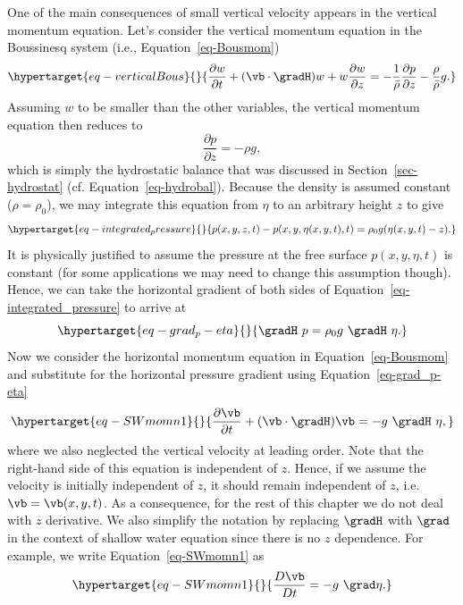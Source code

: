 \documentclass[
  letterpaper,
  twocolumn,
  landscape]{report}
\begin{document}
One of the main consequences of small vertical velocity appears in the
vertical momentum equation. Let's consider the vertical momentum
equation in the Boussinesq system (i.e., Equation~\ref{eq-Bousmom})
\begin{equation}\protect\hypertarget{eq-verticalBous}{}{ \frac{\partial w}{\partial t} + (\vb \cdot\gradH)w + w \frac{\partial w}{\partial z} = -\frac{1}{\bar\rho} \frac{\partial p}{\partial z} -\frac{\rho}{\bar\rho}g. 
}\label{eq-verticalBous}\end{equation} Assuming \(w\) to be smaller than
the other variables, the vertical momentum equation then reduces to \[
    \frac{\partial p}{\partial z} = - \rho g,  
\] which is simply the hydrostatic balance that was discussed in
Section~\ref{sec-hydrostat} (cf. Equation~\ref{eq-hydrobal}). Because
the density is assumed constant (\(\rho = \rho_0\)), we may integrate
this equation from \(\eta\) to an arbitrary height \(z\) to give
\begin{equation}\protect\hypertarget{eq-integrated_pressure}{}{ p(x,y,z,t) - p(x,y,\eta(x,y,t),t) = \rho_0 g (\eta(x,y,t) - z).
}\label{eq-integrated_pressure}\end{equation} It is physically justified
to assume the pressure at the free surface \(p(x,y,\eta,t)\) is constant
(for some applications we may need to change this assumption though).
Hence, we can take the horizontal gradient of both sides of
Equation~\ref{eq-integrated_pressure} to arrive at
\begin{equation}\protect\hypertarget{eq-grad_p-eta}{}{ \gradH \ p = \rho_0 g \ \gradH \ \eta.
}\label{eq-grad_p-eta}\end{equation} Now we consider the horizontal
momentum equation in Equation~\ref{eq-Bousmom} and substitute for the
horizontal pressure gradient using Equation~\ref{eq-grad_p-eta}
\begin{equation}\protect\hypertarget{eq-SWmomn1}{}{ \frac{\partial \vb}{\partial t} + (\vb \cdot\gradH) \vb =  - g \ \gradH \ \eta,
}\label{eq-SWmomn1}\end{equation} where we also neglected the vertical
velocity at leading order. Note that the right-hand side of this
equation is independent of \(z\). Hence, if we assume the velocity is
initially independent of \(z\), it should remain independent of \(z\),
i.e. \(\vb = \vb(x,y,t)\). As a consequence, for the rest of this
chapter we do not deal with \(z\) derivative. We also simplify the
notation by replacing \(\gradH\) with \(\grad\) in the context of
shallow water equation since there is no \(z\) dependence. For example,
we write Equation~\ref{eq-SWmomn1} as
\begin{equation}\protect\hypertarget{eq-SWmomn1}{}{
    \frac{D \vb}{D t}  =  - g \ \grad \eta.
}\label{eq-SWmomn1}\end{equation}
\end{document}
